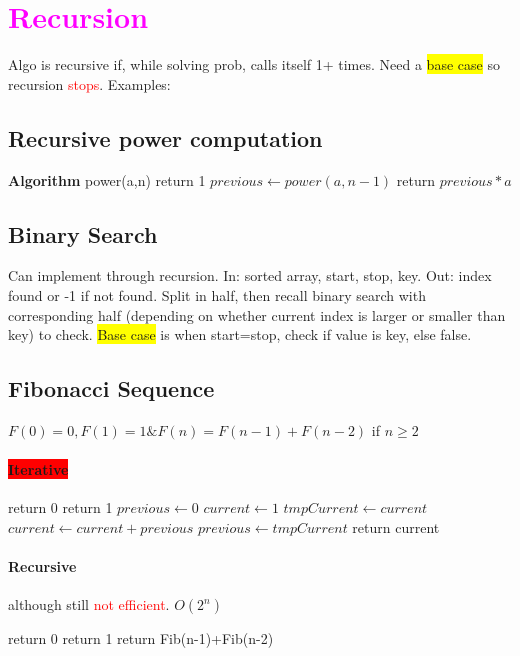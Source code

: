 \section{\textcolor{Fuchsia}{Recursion}}
Algo is recursive if, while solving prob, calls itself 1+ times. Need a \colorbox{Yellow}{base case} so recursion \textcolor{Red}{stops}. Examples:
\subsection{Recursive power computation}
\begin{algorithmic}
	\State \textbf{Algorithm} power(a,n)
	 return 1
	\Else 
		\State $previous \gets power(a,n-1)$
		\State return $previous*a$
	\EndIf
\end{algorithmic}
\subsection{Binary Search} Can implement through recursion. In: sorted array, start, stop, key. Out: index found or -1 if not found. Split in half, then recall binary search with corresponding half (depending on whether current index is larger or smaller than key) to check. \colorbox{Yellow}{Base case} is when start=stop, check if value is key, else false.
\subsection{Fibonacci Sequence} $F(0)=0, F(1)=1 \& F(n)=F(n-1)+F(n-2)$ if $n\geq 2$
\paragraph{\colorbox{Red}{Iterative}}
\begin{algorithmic}
	 return 0
	\EndIf
	 return 1
	\EndIf
	\State $previous \gets 0$
	\State $current \gets 1$
		\State $tmpCurrent \gets current$
		\State $current \gets current+previous$
		\State $previous \gets tmpCurrent$
	\EndFor
	\State return current
\end{algorithmic}
\paragraph{Recursive} although still \textcolor{Red}{not efficient}.
$O(2^n)$
\begin{algorithmic}
	 return 0
	 return 1
	\Else return Fib(n-1)+Fib(n-2)
	\EndIf
\end{algorithmic}
\color {CarnationPink}
